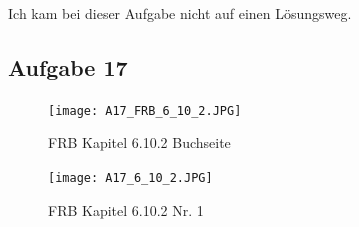 \documentclass{article}
\begin{document}
Ich kam bei dieser Aufgabe nicht auf einen Lösungsweg.

\clearpage
\subsection{Aufgabe 17}

\begin{figure}[H]
    \centering
    \texttt{[image: A17\_FRB\_6\_10\_2.JPG]}
    \caption{FRB Kapitel 6.10.2 Buchseite}
\end{figure}

\begin{figure}[H]
    \centering
    \texttt{[image: A17\_6\_10\_2.JPG]}
    \caption{FRB Kapitel 6.10.2 Nr. 1}
\end{figure}

\clearpage
\label{sec:Anhang}

\end{document}
